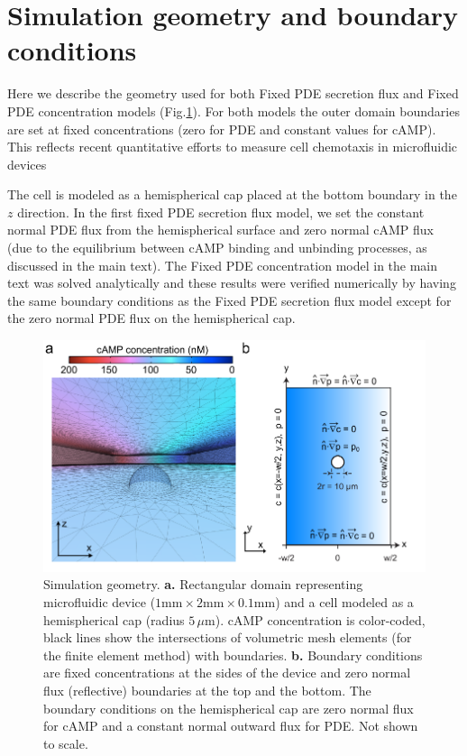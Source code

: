 \documentclass[10pt]{article}
\begin{document}
\section{Simulation geometry and boundary conditions}


Here we describe the geometry used for both Fixed PDE secretion flux and Fixed PDE concentration models (Fig.\ref{fig:domain}). For both models the outer domain boundaries are set at fixed concentrations (zero for PDE and constant values for cAMP). This reflects recent quantitative efforts to measure cell chemotaxis in microfluidic devices \cite{song, eberhard1, fuller-1}

The cell is modeled as a hemispherical cap placed at the bottom boundary in the $z$ direction. In the first fixed PDE secretion flux model, we set the constant normal PDE flux from the hemispherical surface and zero normal cAMP flux (due to the equilibrium between cAMP binding and unbinding processes, as discussed in the main text). The Fixed PDE concentration model in the main text was solved analytically and these results were verified numerically by having the same boundary conditions as the Fixed PDE secretion flux model except for the zero normal PDE flux on the hemispherical cap. 

\begin{figure}[ht!]
	\centering
	\includegraphics[scale=0.67]{../figures/si_comsol_geometry}
	\caption{
	Simulation geometry. 
	\textbf{a.} Rectangular domain representing microfluidic
	device ($1\mathrm{mm}\times2\mathrm{mm}\times0.1\mathrm{mm}$) and
	a cell modeled as a hemispherical cap (radius $5\,\mu\mathrm{m}$).
	cAMP concentration is color-coded, black lines show the intersections
	of volumetric mesh elements (for the finite element method) with boundaries.
	\textbf{b.} Boundary conditions are fixed concentrations at the sides
	of the device and zero normal flux (reflective) boundaries at the
	top and the bottom. The boundary conditions on the hemispherical cap
	are zero normal flux for cAMP and a constant normal outward flux for
	PDE. Not shown to scale.}
	\label{fig:domain}
\end{figure}
\end{document}
